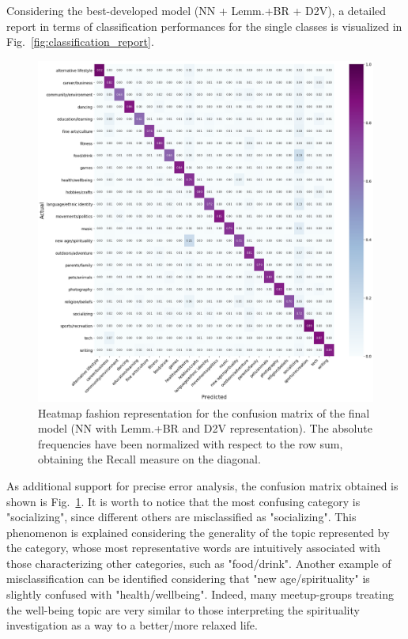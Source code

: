 \documentclass[10pt]{article}
\begin{document}
Considering the best-developed model (NN + Lemm.+BR + D2V), a detailed report in terms of classification performances for the single classes is visualized in Fig.~\ref{fig:classification_report}. 

\begin{figure}
\hspace{-1cm}
\includegraphics[scale=.4]{figs/plot_confusion_matrix.png}
\caption{Heatmap fashion representation for the confusion matrix of the final model (NN with Lemm.+BR and D2V representation). The absolute frequencies have been normalized with respect to the row sum, obtaining the Recall measure on the diagonal.}
\label{fig:confusion_matrix}
\end{figure}

As additional support for precise error analysis, the confusion matrix obtained is shown is Fig.~\ref{fig:confusion_matrix}. 
It is worth to notice that the most confusing category is "socializing", since different others are misclassified as "socializing". 
This phenomenon is explained considering the generality of the topic represented by the category, whose most representative words are intuitively associated with those characterizing other categories, such as "food/drink".
Another example of misclassification can be identified considering that "new age/spirituality" is slightly confused with "health/wellbeing". Indeed, many meetup-groups treating the well-being topic are very similar to those interpreting the spirituality investigation as a way to a better/more relaxed life.
\end{document}

